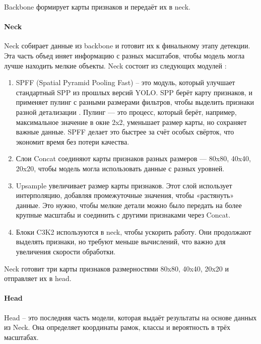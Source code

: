 Backbone формирует карты признаков и передаёт их в neck.

\paragraph{Neck}

Neck собирает данные из backbone и готовит их к финальному этапу детекции. Эта часть объед
иняет информацию с разных масштабов, чтобы модель могла лучше находить мелкие объекты. Neck состоит из следующих модулей \cite{yolo3}:

\begin{enumerate}
	\item SPFF (Spatial Pyramid Pooling Fast) -- это модуль, который улучшает стандартный SPP из прошлых версий YOLO. SPP берёт карту признаков, и применяет пулинг с разными размерами фильтров, чтобы выделить признаки разной детализации \cite{yolo4}. Пулинг — это процесс, который берёт, например, максимальное значение в окне 2x2, уменьшает размер карты, но сохраняет важные данные. SPFF делает это быстрее за счёт особых свёрток, что экономит время без потери качества.
	
	\item Слои Concat соединяют карты признаков разных размеров — 80x80, 40x40, 20x20, чтобы модель могла использовать данные с разных уровней.
	
	\item Upsample увеличивает размер карты признаков. Этот слой использует интерполяцию, добавляя промежуточные значения, чтобы «растянуть» данные. Это нужно, чтобы мелкие детали можно было передать на более крупные масштабы и соединить с другими признаками через Concat.
	
	\item Блоки C3K2 используются в neck, чтобы ускорить работу. Они продолжают выделять признаки, но требуют меньше вычислений, что важно для увеличения скорости обработки.
	
\end{enumerate}

Neck готовит три карты признаков размерностями 80x80, 40x40, 20x20 и отправляет их в head.

\paragraph{Head}

Head -- это последняя часть модели, которая выдаёт результаты на основе данных из Neck. Она определяет координаты рамок, классы и вероятность в трёх масштабах.

